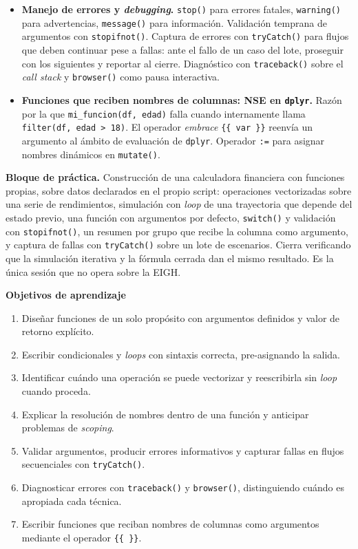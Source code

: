\documentclass[11pt,letterpaper]{article}
\newcommand{\orange}[1]{{\color{redorange}#1}}
\newcommand{\practica}[1]{%
  \medskip\noindent\textbf{\orange{Bloque de práctica.}} #1\par%
}
\begin{document}
\begin{itemize}[leftmargin=*, itemsep=2pt]
    \item \textbf{Manejo de errores y \textit{debugging}.} \texttt{stop()} para errores fatales, \texttt{warning()} para advertencias, \texttt{message()} para información. Validación temprana de argumentos con \texttt{stopifnot()}. Captura de errores con \texttt{tryCatch()} para flujos que deben continuar pese a fallas: ante el fallo de un caso del lote, proseguir con los siguientes y reportar al cierre. Diagnóstico con \texttt{traceback()} sobre el \textit{call stack} y \texttt{browser()} como pausa interactiva.
    \item \textbf{Funciones que reciben nombres de columnas: NSE en \texttt{dplyr}.} Razón por la que \texttt{mi\_funcion(df, edad)} falla cuando internamente llama \texttt{filter(df, edad > 18)}. El operador \textit{embrace} \texttt{\{\{~var~\}\}} reenvía un argumento al ámbito de evaluación de \texttt{dplyr}. Operador \texttt{:=} para asignar nombres dinámicos en \texttt{mutate()}.
\end{itemize}

\practica{Construcción de una calculadora financiera con funciones propias, sobre datos declarados en el propio script: operaciones vectorizadas sobre una serie de rendimientos, simulación con \textit{loop} de una trayectoria que depende del estado previo, una función con argumentos por defecto, \texttt{switch()} y validación con \texttt{stopifnot()}, un resumen por grupo que recibe la columna como argumento, y captura de fallas con \texttt{tryCatch()} sobre un lote de escenarios. Cierra verificando que la simulación iterativa y la fórmula cerrada dan el mismo resultado. Es la única sesión que no opera sobre la EIGH.}

\medskip
\noindent\textbf{Objetivos de aprendizaje}
\begin{enumerate}[leftmargin=*, itemsep=1pt]
    \item Diseñar funciones de un solo propósito con argumentos definidos y valor de retorno explícito.
    \item Escribir condicionales y \textit{loops} con sintaxis correcta, pre-asignando la salida.
    \item Identificar cuándo una operación se puede vectorizar y reescribirla sin \textit{loop} cuando proceda.
    \item Explicar la resolución de nombres dentro de una función y anticipar problemas de \textit{scoping}.
    \item Validar argumentos, producir errores informativos y capturar fallas en flujos secuenciales con \texttt{tryCatch()}.
    \item Diagnosticar errores con \texttt{traceback()} y \texttt{browser()}, distinguiendo cuándo es apropiada cada técnica.
    \item Escribir funciones que reciban nombres de columnas como argumentos mediante el operador \texttt{\{\{~\}\}}.
\end{enumerate}
\end{document}
